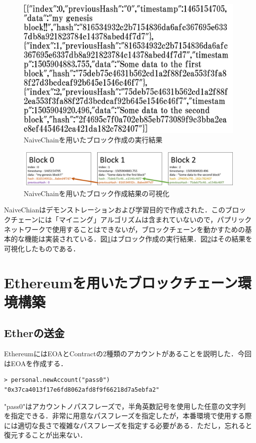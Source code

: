 \begin{figure}[htb]
\centering
\includegraphics[width=12cm]{images/chaincode.jpg}
\caption{NaiveChainを用いたブロック作成の実行結果}\label{chaincode}
\end{figure}

\begin{figure}[htb]
\centering
\includegraphics[width=12cm]{images/block.png}
\caption{NaiveChainを用いたブロック作成結果の可視化}\label{block}
\end{figure}

NaiveChianはデモンストレーションおよび学習目的で作成された．このブロックチェーンには「マイニング」アルゴリズムは含まれていないので，パプリックネットワークで使用することはできないが，ブロックチェーンを動かすための基本的な機能は実装されている．図\ref{chaincode}はブロック作成の実行結果．図\ref{block}はその結果を可視化したものである．

\newpage

\section{Ethereumを用いたブロックチェーン環境構築}
\subsection{Etherの送金}
EthereumにはEOAとContractの2種類のアカウントがあることを説明した．今回はEOAを作成する．
\begin{verbatim}
> personal.newAccount("pass0")
"0x37ca4013f17e6fd8062afd8f9f66218d7a5ebfa2"
\end{verbatim}
"pass0"はアカウントノパスフレーズで，半角英数記号を使用した任意の文字列を指定できる．非常に用意なパスフレーズを指定したが，本番環境で使用する際には適切な長さで複雑なパスフレーズを指定する必要がある．ただし，忘れると復元することが出来ない．

